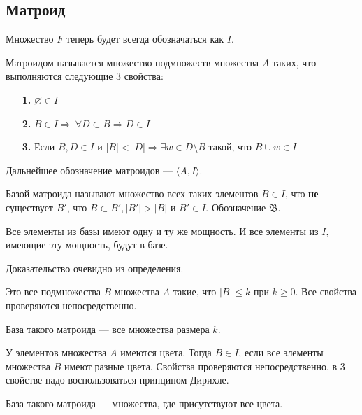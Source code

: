 \documentclass[a4paper, 12pt]{article}
\begin{document}
\subsection{Матроид}

Множество $F$ теперь будет всегда обозначаться как $I$.

Матроидом называется множество подмножеств множества $A$ таких, что выполняются 
следующие 3 свойства:
\begin{itemize}
  \item[{\bf 1.}] $\varnothing \in I$

  \item[{\bf 2.}] $B \in I \Rightarrow \ \forall D \subset B \Rightarrow D \in I$

  \item[{\bf 3.}] Если $B, D \in I$ и $|B| < |D| \Rightarrow \exists w \in D 
  \setminus B$ такой, что $B \cup w \in I$ 
\end{itemize}

Дальнейшее обозначение матроидов --- $\langle A, I\rangle$.

\begin{Def}
  Базой матроида называют множество всех таких элементов $B \in I$, что {\bf не}
   существует $B'$, что $B \subset B', |B'|>|B|$ и $B' \in I$. Обозначение $\mathfrak{B}$.
\end{Def}

\begin{Properties}
  Все элементы из базы имеют одну и ту же мощность. И все элементы из $I$, имеющие
  эту мощность, будут в базе.

  Доказательство очевидно из определения.
\end{Properties}

\begin{Examples}
  Это все подмножества $B$ множества $A$ такие, что
  $|B| \leqslant k$ при $k \geqslant 0$. Все свойства проверяются
  непосредственно. 

  База такого матроида --- все множества 
  размера $k$.
\end{Examples}

\begin{Examples}
  У элементов множества $A$ имеются цвета. Тогда $B \in I$, 
  если все элементы множества $B$ имеют разные цвета. 
  Свойства проверяются непосредственно, в 3 свойстве надо воспользоваться
  принципом Дирихле.

  База такого матроида --- множества, где присутствуют все цвета.
\end{Examples}
\end{document}
